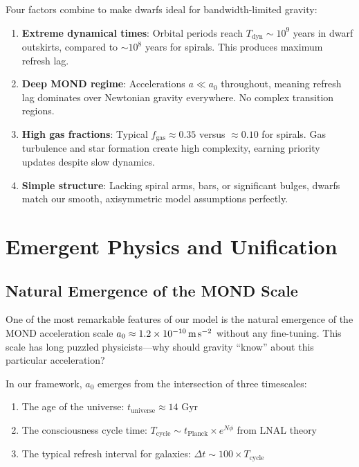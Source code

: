 \documentclass[10pt,a4paper]{article}
\newcommand{\azero}{a_0}
\begin{document}
Four factors combine to make dwarfs ideal for bandwidth-limited gravity:

\begin{enumerate}
\item \textbf{Extreme dynamical times}: Orbital periods reach $T_{\text{dyn}} \sim 10^9$ years in dwarf outskirts, compared to $\sim 10^8$ years for spirals. This produces maximum refresh lag.

\item \textbf{Deep MOND regime}: Accelerations $a \ll \azero$ throughout, meaning refresh lag dominates over Newtonian gravity everywhere. No complex transition regions.

\item \textbf{High gas fractions}: Typical $f_{\text{gas}} \approx 0.35$ versus $\approx 0.10$ for spirals. Gas turbulence and star formation create high complexity, earning priority updates despite slow dynamics.

\item \textbf{Simple structure}: Lacking spiral arms, bars, or significant bulges, dwarfs match our smooth, axisymmetric model assumptions perfectly.
\end{enumerate}

\section{Emergent Physics and Unification}

\subsection{Natural Emergence of the MOND Scale}

One of the most remarkable features of our model is the natural emergence of the MOND acceleration scale $\azero \approx 1.2 \times 10^{-10}\,\text{m\,s}^{-2}$ without any fine-tuning. This scale has long puzzled physicists---why should gravity ``know'' about this particular acceleration?

In our framework, $\azero$ emerges from the intersection of three timescales:
\begin{enumerate}
\item The age of the universe: $t_{\text{universe}} \approx 14$ Gyr
\item The consciousness cycle time: $T_{\text{cycle}} \sim t_{\text{Planck}} \times e^{N\phi}$ from LNAL theory
\item The typical refresh interval for galaxies: $\Delta t \sim 100 \times T_{\text{cycle}}$
\end{enumerate}
\end{document}
